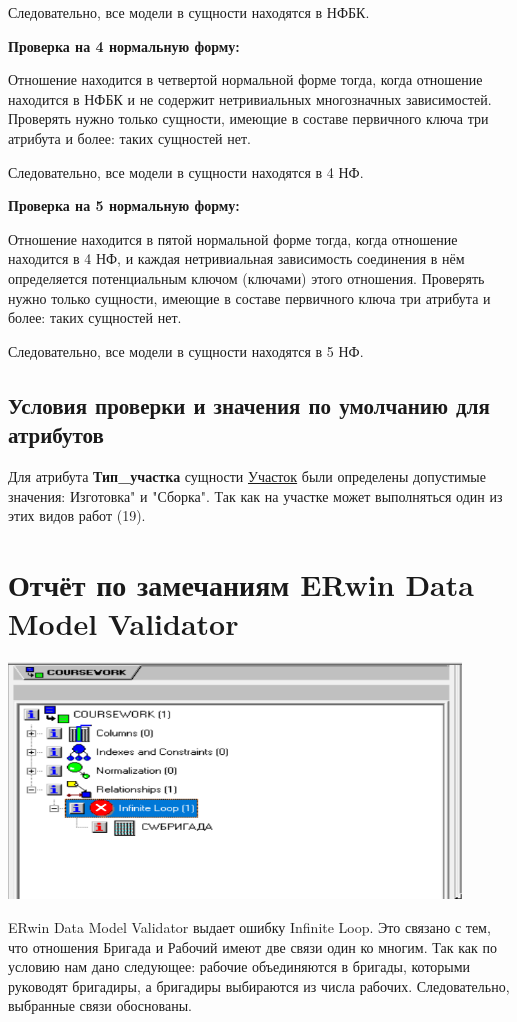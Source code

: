 Следовательно, все модели в сущности находятся в НФБК.

{\bf Проверка на 4 нормальную форму:}

Отношение находится в четвертой нормальной форме тогда, когда отношение находится в НФБК и не содержит нетривиальных многозначных зависимостей.
Проверять нужно только сущности, имеющие в составе первичного ключа три атрибута и более: таких сущностей нет.

Следовательно, все модели в сущности находятся в 4 НФ.

{\bf Проверка на 5 нормальную форму:}

Отношение находится в пятой нормальной форме тогда, когда отношение находится в 4 НФ, и каждая нетривиальная зависимость соединения в нём определяется потенциальным ключом (ключами) этого отношения.
Проверять нужно только сущности, имеющие в составе первичного ключа три атрибута и более: таких сущностей нет.

Следовательно, все модели в сущности находятся в 5 НФ.

\subsection{Условия проверки и значения по умолчанию для атрибутов}

Для атрибута {\bf Тип\_участка} сущности \underline{Участок} были определены допустимые значения: Изготовка" и "Сборка".
Так как на участке может выполняться один из этих видов работ (19).

\section {Отчёт по замечаниям ERwin Data Model Validator}

\includegraphics[width=12cm]{./screenshots/validator/validator.png}

ERwin Data Model Validator выдает ошибку Infinite Loop.
Это связано с тем, что отношения Бригада и Рабочий имеют две связи один ко многим.
Так как по условию нам дано следующее: рабочие объединяются в бригады, которыми руководят бригадиры, а бригадиры выбираются из числа рабочих.
Следовательно, выбранные связи обоснованы.

